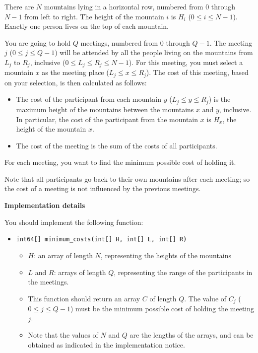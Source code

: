 There are $N$ mountains lying in a horizontal row, numbered from $0$ through $N-1$ from
left to right. The height of the mountain $i$ is $H_i$ ($0\le i\le N-1$). Exactly one person
lives on the top of each mountain.

You are going to hold $Q$ meetings, numbered from $0$ through $Q-1$. The meeting $j$ ($0 \le j 
\le Q-1$) will be attended by all the people living on the mountains from $L_j$ to $R_j$,
inclusive ($0\le L_j \le R_j \le N-1$). For this meeting, you must select a mountain $x$ as the
meeting place ($L_j \le x \le R_j$).  The cost of this meeting, based on your selection, is then
calculated as follows:
\begin{itemize}
    \item The cost of the participant from each mountain $y$ ($L_j \le y \le R_j$) is the maximum
height of the mountains between the mountains $x$ and $y$, inclusive. In particular,
the cost of the participant from the mountain $x$ is $H_x$, the height of the mountain $x$.

\item The cost of the meeting is the sum of the costs of all participants.
\end{itemize}


For each meeting, you want to find the minimum possible cost of holding it.

Note that all participants go back to their own mountains after each meeting; so the
cost of a meeting is not influenced by the previous meetings.


\textbf{Implementation details}

You should implement the following function:

\begin{itemize}
    \item \texttt{int64[] minimum\_costs(int[] H, int[] L, int[] R)}
    \begin{itemize}
        \item $H$: an array of length $N$, representing the heights of the mountains
        \item $L$ and $R$: arrays of length $Q$, representing the range of the participants in the
meetings.
        \item This function should return an array $C$ of length $Q$. The value of $C_j$ ($0\le j\le Q-1$)
 must be the minimum possible cost of holding the meeting $j$.
\item Note that the values of $N$ and $Q$ are the lengths of the arrays, and can be
obtained as indicated in the implementation notice.
    \end{itemize}
\end{itemize}



